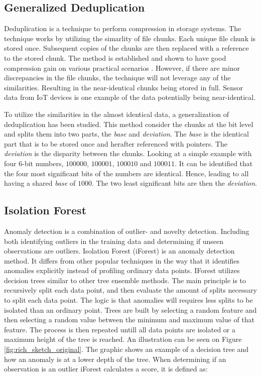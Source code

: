 \subsection{Generalized Deduplication}
Deduplication is a technique to perform compression in storage systems. The technique works by utilizing the simarlity of file chunks. Each unique file chunk is stored once. Subsequent copies of the chunks are then replaced with a reference to the stored chunk. The method is established and shown to have good compression gain on various practical scenarios \cite{deduplication}. However, if there are minor discrepancies in the file chunks, the technique will not leverage any of the similarities. Resulting in the near-identical chunks being stored in full. Sensor data from IoT devices is one example of the data potentially being near-identical. 

To utilize the similarities in the almost identical data, a generalization of deduplication has been studied.     
This method consider the chunks at the bit level and splits them into two parts, the \textit{base} and \textit{deviation}. The \textit{base} is the identical part that is to be stored once and herafter referenced with pointers. The \textit{deviation} is the disparity between the chunks. Looking at a simple example with four 6-bit numbers, $100000$, $100001$, $100010$ and $100011$. It can be identified that the four most significant bits of the numbers are identical. Hence, leading to all having a shared \textit{base} of $1000$. The two least significant bits are then the \textit{deviation}\cite{gen-deduplication}.   

\subsection{Isolation Forest}
Anomaly detection is a combination of outlier- and novelty detection. Including both identifying outliers in the training data and determining if unseen observations are outliers. Isolation Forest (iForest) is an anomaly detection method. It differs from other popular techniques in the way that it identifies anomalies explicitly instead of profiling ordinary data points\cite{iforest}. IForest utilizes decision trees similar to other tree ensemble methods.
The main principle is to recursively split each data point, and then evaluate the amount of splits necessary to split each data point. The logic is that anomalies will requires less splits to be isolated than an ordinary point.  
Trees are built by selecting a random feature and then selecting a random value between the minimum and maximum value of that feature. The process is then repeated untill all data points are isolated or a maximum height of the tree is reached. An illustration can be seen on Figure \ref{fig:rich_sketch_original}. The graphic shows an example of a decision tree and how an anomaly is at a lower depth of the tree. When determining if an observation is an outlier iForest calculates a score, it is defined as: 

